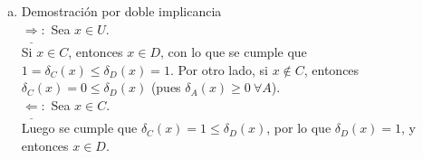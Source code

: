 \documentclass[dcc]{fcfmcourse}
\begin{document}
\begin{problems}
\begin{enumerate}[a)]
\item 
Demostración por doble implicancia\\

$\underline{\Rightarrow}:$ 
Sea $x\in U$. \\
Si $x\in C$, entonces $x\in D$, con lo que se cumple que $1 = \delta_{C}(x) \leq \delta_{D}(x) = 1$. Por otro lado, si $x \not \in C$, entonces $\delta_{C}(x) = 0 \leq \delta_{D}(x)$ (pues $\delta_{A}(x) \geq 0\ \forall A$).\\

$\underline{\Leftarrow}:$ 
Sea $x\in C$.\\
Luego se cumple que $\delta_{C}(x) = 1 \leq \delta_{D}(x)$, por lo que $\delta_{D}(x) = 1$, y entonces $x\in D$.

\end{enumerate}
\end{problems}
\end{document}
